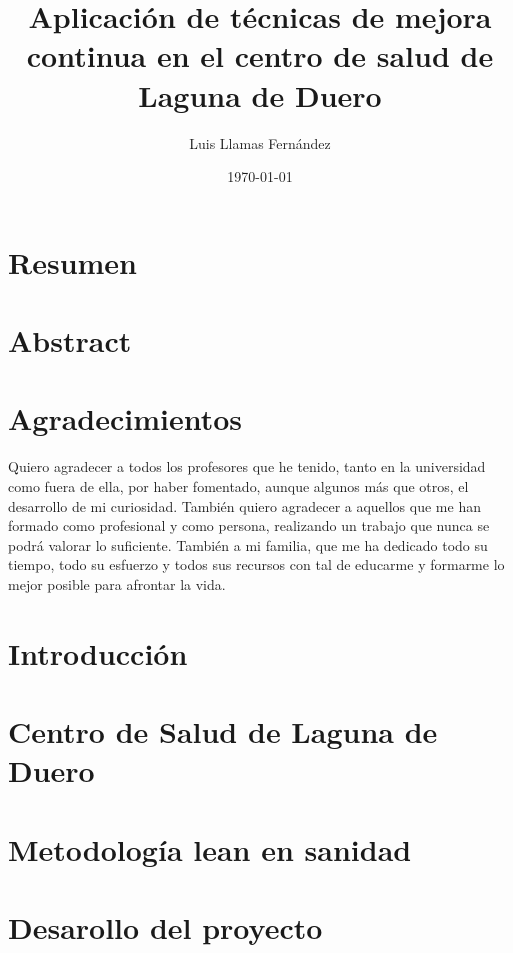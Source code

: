 \documentclass[12pt, a4paper, twoside, openright]{report}
\begin{document}
\title{Aplicación de técnicas de mejora continua en el centro de salud de Laguna de Duero}
\author{Luis Llamas Fernández}
\date{\today}
\maketitle

\thispagestyle{empty}

\chapter*{Resumen}
\lipsum[1-2]

\setcounter{page}{1}

\chapter*{Abstract}
\lipsum[3-4]

\chapter*{Agradecimientos}
Quiero agradecer a todos los profesores que he tenido, tanto en la universidad como fuera de ella, por haber fomentado, aunque algunos más que otros, el desarrollo de mi curiosidad. También quiero agradecer a aquellos que me han formado como profesional y como persona, realizando un trabajo que nunca se podrá valorar lo suficiente. También a mi familia, que me ha dedicado todo su tiempo, todo su esfuerzo y todos sus recursos con tal de educarme y formarme lo mejor posible para afrontar la vida.

\tableofcontents

\chapter{Introducción}


\chapter{Centro de Salud de Laguna de Duero}


\chapter{Metodología lean en sanidad}


\chapter{Desarollo del proyecto}

\end{document}
